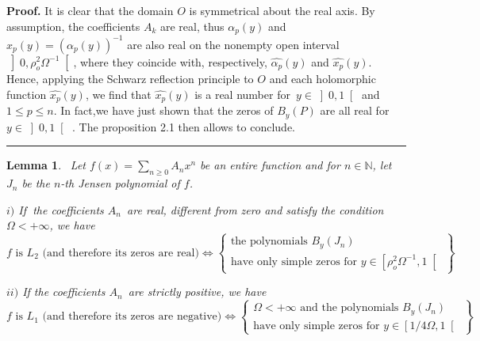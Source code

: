 \documentclass{article}
\newtheorem{lemma}[theorem]{Lemma}
\newenvironment{proof}[1][Proof]{\textbf{#1.} }{\ \rule{0.5em}{0.5em}}
\begin{document}
\begin{proof}
It is clear that the domain $O$ is symmetrical about the real axis. By
assumption, the coefficients $A_{k}$ are real, thus $\alpha _{p}\left(
y\right) $ and $x_{p}\left( y\right) =\left( \alpha _{p}\left( y\right)
\right) ^{-1}$ are also real on the nonempty open interval $\left] 0,\rho
_{o}^{2}\Omega ^{-1}\right[ $, where they coincide with, respectively, $\widehat{\alpha _{p}}\left( y\right) $ and $\widehat{x_{p}}\left( y\right) $. Hence, applying the Schwarz reflection principle to $O$ and each
holomorphic function $\widehat{x_{p}}\left( y\right) $, we find that $\widehat{x_{p}}\left( y\right) $ is a real number for\ $y\in \left] 0,1\right[ $ and $1\leq p\leq n$. In fact,we have just shown that the zeros of $B_{y}\left( P\right) $ are all real for $y\in \left] 0,1\right[ $ . The
proposition 2.1 then allows to conclude.
\end{proof}

\begin{lemma}
\bigskip\ Let $f\left( x\right) =\sum_{n\geq 0}A_{n}x^{n}$ be an entire
function and for $n\in \mathbb{N}$, let $J_{n}$ be the $n$-th Jensen
polynomial of $f$.

$i)$ If $\ $the coefficients $A_{n}$\ are real, different from zero and
satisfy the condition $\Omega <+\infty $, we have 
\begin{equation*}
f\text{ is }L_{2}\text{ (and therefore its zeros are real)}\Longleftrightarrow \left\{ 
\begin{array}{c}
\text{the polynomials }B_{y}\left( J_{n}\right) \text{ } \\ 
\text{have only simple zeros for }y\in \left[ \rho _{o}^{2}\Omega ^{-1},1\right[ 
\end{array}
\right\} 
\end{equation*}

$ii)$ If the coefficients $A_{n}$\ are strictly positive, we have 
\begin{equation*}
f\text{ is }L_{1}\text{ (and therefore its zeros are negative)}\Longleftrightarrow \left\{ 
\begin{array}{c}
\Omega <+\infty \text{ \ and the polynomials }B_{y}\left( J_{n}\right) \text{
} \\ 
\text{have only simple zeros for }y\in \left[ 1/4\Omega ,1\right[ 
\end{array}
\right\} 
\end{equation*}
\end{lemma}
\end{document}

